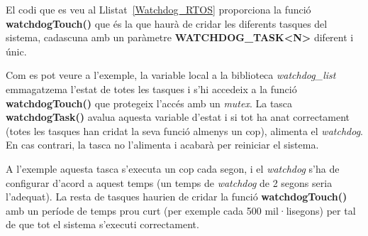 El codi que es veu al Llistat~\ref{Watchdog_RTOS} proporciona la funció {\bf watchdogTouch()} que és la que haurà de cridar les diferents tasques del sistema, cadascuna amb un paràmetre {\bf WATCHDOG\_TASK<N>} diferent i únic.

Com es pot veure a l'exemple, la variable local a la biblioteca {\em watchdog\_list} emmagatzema l'estat de totes les tasques i s'hi accedeix a la funció {\bf watchdogTouch()} que protegeix l'accés amb un {\em mutex}. La tasca {\bf watchdogTask()} avalua aquesta variable d'estat i si tot ha anat correctament (totes les tasques han cridat la seva funció almenys un cop), alimenta el {\em watchdog}. En cas contrari, la tasca no l'alimenta i acabarà per reiniciar el sistema.

A l'exemple aquesta tasca s'executa un cop cada segon, i el {\em watchdog} s'ha de configurar d'acord a aquest temps (un temps de {\em watchdog} de 2 segons seria l'adequat). La resta de tasques haurien de cridar la funció {\bf watchdogTouch()} amb un període de temps prou curt (per exemple cada 500 mil·lisegons) per tal de que tot el sistema s'executi correctament.

